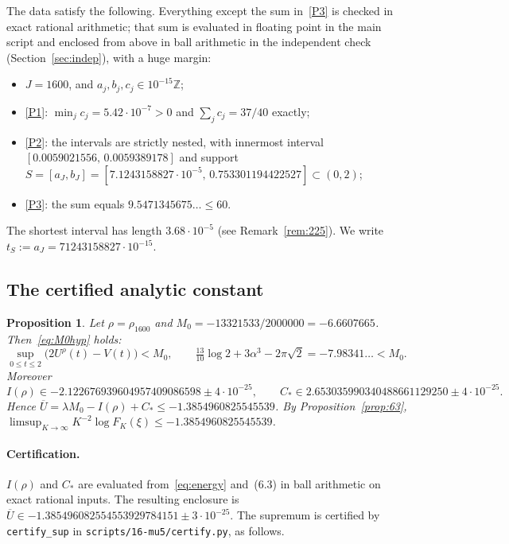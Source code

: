 \documentclass[11pt]{article}
\newtheorem{proposition}{Proposition}
\theoremstyle{remark}
\newcommand{\Z}{\mathbb{Z}}
\newcommand{\Ubar}{\overline{U}}
\newcommand{\file}[1]{\texttt{#1}}
\newcommand{\Cstar}{C_{*}}
\begin{document}
The data satisfy the following. Everything except the sum in~\ref{P3} is checked in exact rational arithmetic; that sum is evaluated in floating point in the main script and enclosed from above in ball arithmetic in the independent check (Section~\ref{sec:indep}), with a huge margin:
\begin{itemize}
\item $J=1600$, and $a_j,b_j,c_j\in10^{-15}\Z$;
\item \ref{P1}: $\min_jc_j=5.42\cdot10^{-7}>0$ and $\sum_jc_j=37/40$ exactly;
\item \ref{P2}: the intervals are strictly nested, with innermost interval $[0.0059021556,\,0.0059389178]$ and support $S=[a_J,b_J]=[7.1243158827\cdot10^{-5},\,0.753301194422527]\subset(0,2)$;
\item \ref{P3}: the sum equals $9.5471345675\ldots\le60$.
\end{itemize}
The shortest interval has length $3.68\cdot10^{-5}$ (see Remark~\ref{rem:225}). We write $t_S:=a_J=71243158827\cdot10^{-15}$.

\subsection{The certified analytic constant}

\begin{proposition}\label{prop:Ucert}
Let $\rho=\rho_{1600}$ and $M_0=-13321533/2000000=-6.6607665$. Then~\eqref{eq:M0hyp} holds:
\[
\sup_{0\le t\le2}\bigl(2U^\rho(t)-V(t)\bigr)<M_0,\qquad\tfrac{13}{10}\log2+3\alpha^3-2\pi\sqrt2=-7.98341\ldots<M_0 .
\]
Moreover
\[
I(\rho)\in-2.122676939604957409086598\pm4\cdot10^{-25},\qquad\Cstar\in2.653035990340488661129250\pm4\cdot10^{-25}.
\]
Hence $\Ubar=\lambda M_0-I(\rho)+\Cstar\le-1.3854960825545539$. By Proposition~\ref{prop:63}, $\limsup_{K\to\infty}K^{-2}\log F_K(\xi)\le-1.3854960825545539$.
\end{proposition}

\paragraph{Certification.} $I(\rho)$ and $\Cstar$ are evaluated from~\eqref{eq:energy} and~(6.3) in ball arithmetic on exact rational inputs. The resulting enclosure is $\Ubar\in-1.385496082554553929784151\pm3\cdot10^{-25}$. The supremum is certified by \file{certify\_sup} in \file{scripts/16-mu5/certify.py}, as follows.
\end{document}
